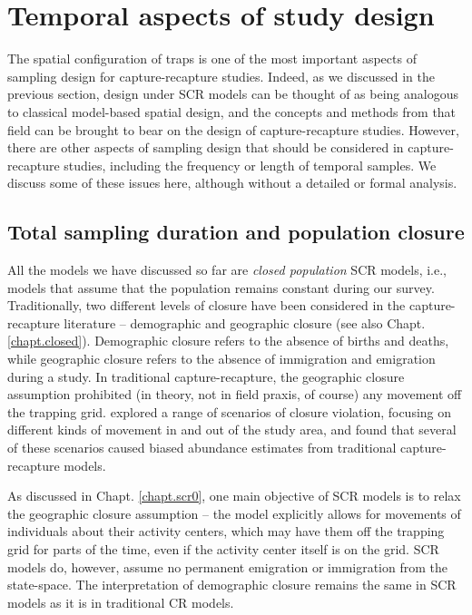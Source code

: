 \section{Temporal aspects of study design}

The spatial configuration of traps is one of the most important
aspects of sampling design for capture-recapture studies. Indeed, as
we discussed in the previous section, design under SCR models can be
thought of as being analogous to classical model-based spatial design,
and the concepts and methods from that field can be brought to bear on
the design of capture-recapture studies.
However, there are other aspects of sampling design that should be
considered in capture-recapture studies, including the frequency or
length of temporal samples. We discuss some of these issues here,
although without a detailed or formal analysis.

\subsection{Total sampling duration and population closure}

All the models we have discussed so far
are {\it closed population} SCR models, i.e., models that assume
that the population remains constant during our survey. Traditionally,
two different levels of closure have been considered in the
capture-recapture literature -- demographic and geographic closure
(see also Chapt. \ref{chapt.closed}). Demographic closure refers to
the absence of births and deaths, while geographic closure refers to
the absence of immigration and emigration during a study. In
traditional capture-recapture, the geographic closure assumption
prohibited (in theory, not in field praxis, of course) any movement
off the trapping grid.  \citet{kendall:1999} explored a range of
scenarios of closure violation, focusing on different kinds of
movement in and out of the study area, and found that several of these
scenarios caused biased abundance estimates from traditional
capture-recapture models.


As discussed in Chapt. \ref{chapt.scr0}, one main objective of SCR
models is to relax the geographic closure assumption -- the model
explicitly allows for movements of individuals about their activity
centers, which may have them off the trapping grid for parts of the
time, even if the activity center itself is on the grid. SCR models
do, however, assume no permanent emigration or immigration from the
state-space. The interpretation of demographic closure remains the
same in SCR models as it is in traditional CR models.


